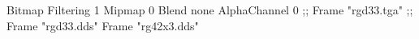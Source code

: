 {Bitmap
	{Filtering 1}
	{Mipmap 0}
	{Blend none}
	{AlphaChannel 0}
;;	{Frame "rgd33.tga"}
;;	{Frame "rgd33.dds"}
	{Frame "rg42x3.dds"}
}
